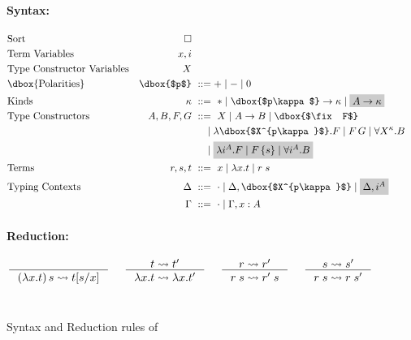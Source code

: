 \begin{figure}\begin{singlespace}
	\small
\paragraph{Syntax:}
\begin{align*}
\!\!\!\!\!\!\!\!&\text{Sort}
 	& \square
	\\
\!\!\!\!\!\!\!\!&\text{Term Variables}
 	& x,i
\\
\!\!\!\!\!\!\!\!&\text{Type Constructor Variables}
 	& X
\\
\!\!\!\!\!\!\!\!&\text{\dbox{Polarities}}
	& \dbox{$p$} &~ ::= + \mid - \mid 0
\\
\!\!\!\!\!\!\!\!&\text{Kinds}
 	& \kappa		&~ ::= ~ *
				\mid \dbox{$p\kappa$} -> \kappa
				\mid \newFi{A -> \kappa}
\\
\!\!\!\!\!\!\!\!&\text{Type Constructors}
	& A,B,F,G		&~ ::= ~ X
				\mid A -> B
				\mid \dbox{$\fix F$} \\ &&& ~\quad
				\mid \lambda \dbox{$X^{p\kappa}$}.F
				\mid F\,G
				\mid \forall X^\kappa . B \\ &&& ~\quad
				\mid \newFi{\lambda i^A.F
				\mid F\,\{s\}
				\mid \forall i^A . B}
\\
\!\!\!\!\!\!\!\!&\text{Terms}
	& r,s,t			&~ ::= ~ x \mid \lambda x.t \mid r\;s
\\
\!\!\!\!\!\!\!\!&\text{Typing Contexts}
	& \Delta		&~ ::= ~ \cdot
				\mid \Delta,\dbox{$X^{p\kappa}$}
				\mid \newFi{\Delta, i^A} \\
&	& \Gamma		&~ ::= ~ \cdot
				\mid \Gamma, x : A
\end{align*}
\paragraph{Reduction:} 
\[ 
   \inference{}{(\lambda x.t)\,s \rightsquigarrow t[s/x]}
 ~~~~
   \inference{t \rightsquigarrow t'}{\lambda x.t \rightsquigarrow \lambda x.t'}
 ~~~~
   \inference{r \rightsquigarrow r'}{r\;s \rightsquigarrow r'\;s}
 ~~~~
   \inference{s \rightsquigarrow s'}{r\;s \rightsquigarrow r\;s'}
\]
~\\
\end{singlespace}
\caption{Syntax and Reduction rules of \Fixi}
\label{fig:Fixi}
\end{figure}

